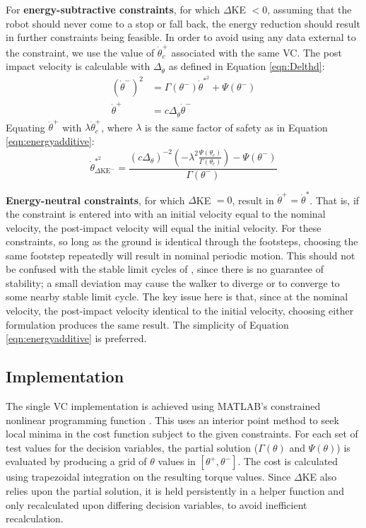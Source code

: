 For \textbf{energy-subtractive constraints}, for which $\Delta$KE $<0$, assuming that the robot should never come to a stop or fall back, the energy reduction should result in further constraints being feasible. In order to avoid using any data external to the constraint, we use the value of $\dot{\theta}^+_c$ associated with the same VC. The post impact velocity is calculable with $\Delta_{\dot{\theta}}$ as defined in Equation \ref{eqn:Delthd}:
\begin{subequations}
	\begin{align}
	\left(\dot{\theta}^-\right)^2 &= \Gamma(\theta^-)\dot{\theta}^{*^2} + \Psi(\theta^-) \\
	\dot{\theta}^+ &= c\Delta_{\dot{\theta}}\dot{\theta}^-
	\end{align}
\end{subequations}
Equating $\dot{\theta}^+$ with $\lambda\dot{\theta}^+_c$, where $\lambda$ is the same factor of safety as in Equation \ref{eqn:energyadditive}:
\begin{equation}
	\dot{\theta}_{\Delta\mathrm{KE}^-}^{*^2} = \frac{(c\Delta_{\dot{\theta}})^{-2}\left(-\lambda^2\frac{ \Psi(\theta_c)}{ \Gamma(\theta_c)}\right) - \Psi(\theta^-)} {\Gamma(\theta^-)}
\end{equation}

\textbf{Energy-neutral constraints}, for which $\Delta$KE $=0$, result in $\dot{\theta}^+ = \dot{\theta}^*$. That is, if the constraint is entered into with an initial velocity equal to the nominal velocity, the post-impact velocity will equal the initial velocity. For these constraints, so long as the ground is identical through the footsteps, choosing the same footstep repeatedly will result in nominal periodic motion. This should not be confused with the stable limit cycles of \cite{grizzle2001asymptotically, franken2008analysis}, since there is no guarantee of stability; a small deviation may cause the walker to diverge or to converge to some nearby stable limit cycle. The key issue here is that, since at the nominal velocity, the post-impact velocity identical to the initial velocity, choosing either formulation produces the same result. The simplicity of Equation \ref{eqn:energyadditive} is preferred.

\subsection{Implementation}
The single VC implementation is achieved using MATLAB's constrained nonlinear programming function . This uses an interior point method to seek local minima in the cost function subject to the given constraints. For each set of test values for the decision variables, the partial solution ($\Gamma(\theta)$ and $\Psi(\theta)$) is evaluated by producing a grid of $\theta$ values in $[\theta^+, \theta^-]$. The cost is calculated using trapezoidal integration on the resulting torque values. Since $\Delta$KE also relies upon the partial solution, it is held persistently in a helper function and only recalculated upon differing decision variables, to avoid inefficient recalculation.

